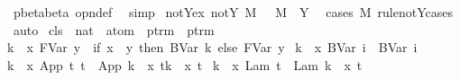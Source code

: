 \begin{isabellebody}
%
\isadelimproof
%
\endisadelimproof
%
\isatagproof
{}\isamarkupfalse%
\ pbeta{\isachardot}beta\ opn{\isacharprime}{\isacharunderscore}def\ \isamarkupfalse%
\ simp%
\endisatagproof
{\isafoldproof}%
%
\isadelimproof
\isanewline
%
\endisadelimproof
\isanewline
{}\isamarkupfalse%
\ not{\isacharunderscore}Y{\isacharunderscore}ex{\isacharcolon}\ {\isachardoublequoteopen}{\isasymnot}{\isacharparenleft}not{\isacharunderscore}Y\ M{\isacharparenright}\ {\isasymLongrightarrow}\ {\isasymexists}{\isasymsigma}{\isachardot}\ M\ {\isacharequal}\ Y\ {\isasymsigma}{\isachardoublequoteclose}\isanewline
%
\isadelimproof
%
\endisadelimproof
%
\isatagproof
{}\isamarkupfalse%
\ {\isacharparenleft}cases\ M\ rule{\isacharcolon}not{\isacharunderscore}Y{\isachardot}cases{\isacharparenright}\isanewline
{}\isamarkupfalse%
\ auto%
\endisatagproof
{\isafoldproof}%
%
\isadelimproof
%
\endisadelimproof
%
\isamarkuptrue%
\isamarkupfalse%
\ cls\ {\isacharcolon}{\isacharcolon}\ {\isachardoublequoteopen}nat\ {\isasymRightarrow}\ atom\ {\isasymRightarrow}\ ptrm\ {\isasymRightarrow}\ ptrm{\isachardoublequoteclose}\ {\isacharparenleft}{\isachardoublequoteopen}{\isacharbraceleft}{\isacharunderscore}\ {\isacharless}{\isacharminus}\ {\isacharunderscore}{\isacharbraceright}\ {\isacharunderscore}{\isachardoublequoteclose}{\isacharparenright}\ \ \isanewline
{\isachardoublequoteopen}{\isacharbraceleft}k\ {\isacharless}{\isacharminus}\ x{\isacharbraceright}\ {\isacharparenleft}FVar\ y{\isacharparenright}\ {\isacharequal}\ {\isacharparenleft}if\ x\ {\isacharequal}\ y\ then\ BVar\ k\ else\ FVar\ y{\isacharparenright}{\isachardoublequoteclose}\ {\isacharbar}\isanewline
{\isachardoublequoteopen}{\isacharbraceleft}k\ {\isacharless}{\isacharminus}\ x{\isacharbraceright}\ {\isacharparenleft}BVar\ i{\isacharparenright}\ {\isacharequal}\ BVar\ i{\isachardoublequoteclose}\ {\isacharbar}\isanewline
{\isachardoublequoteopen}{\isacharbraceleft}k\ {\isacharless}{\isacharminus}\ x{\isacharbraceright}\ {\isacharparenleft}App\ t{}\ t{}{\isacharparenright}\ {\isacharequal}\ App\ {\isacharparenleft}{\isacharbraceleft}k\ {\isacharless}{\isacharminus}\ x{\isacharbraceright}\ t{}{\isacharparenright}{\isacharparenleft}{\isacharbraceleft}k\ {\isacharless}{\isacharminus}\ x{\isacharbraceright}\ t{}{\isacharparenright}{\isachardoublequoteclose}\ {\isacharbar}\isanewline
{\isachardoublequoteopen}{\isacharbraceleft}k\ {\isacharless}{\isacharminus}\ x{\isacharbraceright}\ {\isacharparenleft}Lam\ t{\isacharparenright}\ {\isacharequal}\ Lam\ {\isacharparenleft}{\isacharbraceleft}{\isacharparenleft}k{\isacharplus}{}{\isacharparenright}\ {\isacharless}{\isacharminus}\ x{\isacharbraceright}\ t{\isacharparenright}{\isachardoublequoteclose}\ {\isacharbar}\isanewline

\end{isabellebody}
